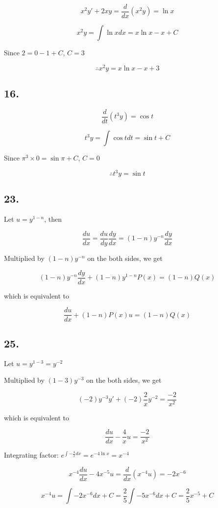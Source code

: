 \documentclass{article}
\begin{document}
  $$x^2 y' + 2xy = \frac{d}{dx} (x^2y) = \ln x$$

  $$x^2y = \int \ln x dx = x\ln x - x + C$$

  Since $2 = 0 - 1 + C$, $C = 3$

  $$\therefore x^2y = x\ln x - x + 3$$

  \subsection*{16. }

  $$\frac{d}{dt} (t^3 y) = \cos t $$

  $$t^3y = \int \cos t dt = \sin t + C$$

  Since $\pi^3\times 0 = \sin \pi + C$, $C = 0$

  $$\therefore t^3 y = \sin t$$

  \subsection*{23. }

  Let $u = y^{1-n}$, then

  $$\frac{du}{dx} = \frac{du}{dy} \frac{dy}{dx} = (1-n)y^{-n} \frac{dy}{dx}$$

  Multiplied by $(1-n)y^{-n}$ on the both sides, we get

  $$(1-n)y^{-n} \frac{dy}{dx} + (1-n)y^{1-n}P(x) =(1-n) Q(x)$$
  
  which is equivalent to

  $$\frac{du}{dx} + (1-n)P(x) u = (1-n)Q(x)$$

  \subsection*{25. }

  Let $u = y^{1-3} = y^{-2}$

  Multiplied by $(1-3) y^{-3}$ on the both sides, we get

  $$(-2)y^{-3} y' + (-2) \frac{2}{x} y^{-2} = \frac{-2}{x^2}$$

  which is equivalent to

  $$\frac{du}{dx} - \frac{4}{x} u = \frac{-2}{x^2}$$

  Integrating factor: $ e^{\int -\frac{4}{x} dx} = e^{-4\ln x} = x^{-4} $

  $$x^{-4} \frac{du}{dx} - 4x^{-5} u = \frac{d}{dx}(x^{-4} u) = -2x^{-6}$$

  $$x^{-4} u = \int -2x^{-6} dx + C = \frac 2 5 \int -5x^{-6} dx + C = \frac 2 5 x^{-5} + C$$
\end{document}
